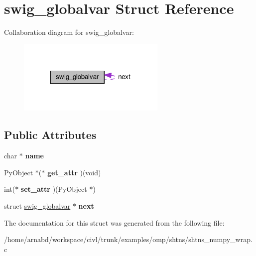 \hypertarget{structswig__globalvar}{}\section{swig\+\_\+globalvar Struct Reference}
\label{structswig__globalvar}


Collaboration diagram for swig\+\_\+globalvar\+:
\nopagebreak
\begin{figure}[H]
\begin{center}
\leavevmode
\includegraphics[width=201pt]{structswig__globalvar__coll__graph}
\end{center}
\end{figure}
\subsection*{Public Attributes}
\begin{DoxyCompactItemize}
\item 
\hypertarget{structswig__globalvar_a32fcb5efb741f97e5c53e1a253cafdd9}{}char $\ast$ {\bfseries name}\label{structswig__globalvar_a32fcb5efb741f97e5c53e1a253cafdd9}

\item 
\hypertarget{structswig__globalvar_ab617d0ca02f7660a9e5fd31dceaf6475}{}Py\+Object $\ast$($\ast$ {\bfseries get\+\_\+attr} )(void)\label{structswig__globalvar_ab617d0ca02f7660a9e5fd31dceaf6475}

\item 
\hypertarget{structswig__globalvar_acff619325c0e354df88508d64c1608e6}{}int($\ast$ {\bfseries set\+\_\+attr} )(Py\+Object $\ast$)\label{structswig__globalvar_acff619325c0e354df88508d64c1608e6}

\item 
\hypertarget{structswig__globalvar_a6b7f8fdec3a5c39a52b33c916d7ba028}{}struct \hyperlink{structswig__globalvar}{swig\+\_\+globalvar} $\ast$ {\bfseries next}\label{structswig__globalvar_a6b7f8fdec3a5c39a52b33c916d7ba028}

\end{DoxyCompactItemize}


The documentation for this struct was generated from the following file\+:\begin{DoxyCompactItemize}
\item 
/home/arnabd/workspace/civl/trunk/examples/omp/shtns/shtns\+\_\+numpy\+\_\+wrap.\+c\end{DoxyCompactItemize}
